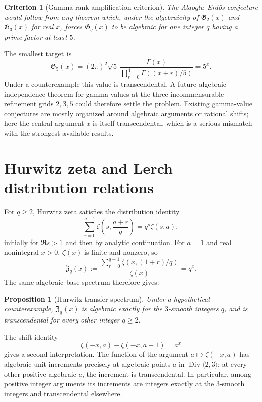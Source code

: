 \documentclass[11pt]{article}
\numberwithin{equation}{section}
\newtheorem{proposition}[theorem]{Proposition}
\newtheorem{criterion}[theorem]{Criterion}
\theoremstyle{definition}
\theoremstyle{remark}
\newcommand{\Div}{\operatorname{Div}}
\begin{document}
\begin{criterion}[Gamma rank-amplification criterion]
\label{crit:gamma5}
The Alaoglu--Erd\H{o}s conjecture would follow from any theorem which, under the algebraicity of $\mathfrak G_2(x)$ and $\mathfrak G_3(x)$ for real $x$, forces $\mathfrak G_q(x)$ to be algebraic for one integer $q$ having a prime factor at least $5$.
\end{criterion}

The smallest target is
\begin{equation}
 \mathfrak G_5(x)
 =(2\pi)^2\sqrt5\,
 \frac{\Gamma(x)}{\prod_{r=0}^4\Gamma((x+r)/5)}=5^x.
 \label{eq:G5}
\end{equation}
Under a counterexample this value is transcendental.  A future algebraic-independence theorem for gamma values at the three incommensurable refinement grids $2,3,5$ could therefore settle the problem.  Existing gamma-value conjectures are mostly organized around algebraic arguments or rational shifts; here the central argument $x$ is itself transcendental, which is a serious mismatch with the strongest available results.

\section{Hurwitz zeta and Lerch distribution relations}
\label{sec:hurwitz}

For $q\ge2$, Hurwitz zeta satisfies the distribution identity
\begin{equation}
 \sum_{r=0}^{q-1}\zeta\!\left(s,\frac{a+r}{q}\right)
 =q^s\zeta(s,a),
 \label{eq:hurwitz-distribution}
\end{equation}
initially for $\Re s>1$ and then by analytic continuation.  For $a=1$ and real nonintegral $x>0$, $\zeta(x)$ is finite and nonzero, so
\begin{equation}
 \mathfrak Z_q(x):=
 \frac{\sum_{r=0}^{q-1}\zeta(x,(1+r)/q)}{\zeta(x)}=q^x.
 \label{eq:Zq}
\end{equation}
The same algebraic-base spectrum therefore gives:

\begin{proposition}[Hurwitz transfer spectrum]
Under a hypothetical counterexample, $\mathfrak Z_q(x)$ is algebraic exactly for the $3$-smooth integers $q$, and is transcendental for every other integer $q\ge2$.
\end{proposition}

The shift identity
\begin{equation}
 \zeta(-x,a)-\zeta(-x,a+1)=a^x
 \label{eq:hurwitz-shift}
\end{equation}
gives a second interpretation.  The function of the argument $a\mapsto\zeta(-x,a)$ has algebraic unit increments precisely at algebraic points $a$ in $\Div\langle2,3\rangle$; at every other positive algebraic $a$, the increment is transcendental.  In particular, among positive integer arguments its increments are integers exactly at the $3$-smooth integers and transcendental elsewhere.
\end{document}
